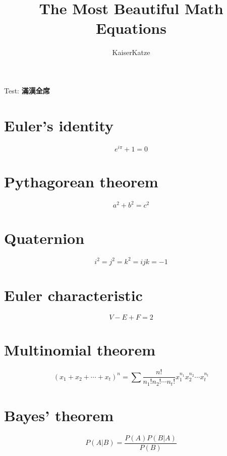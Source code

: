 \documentclass[12pt,twoside]{ctexart}
\title{The Most Beautiful Math Equations}
\author{KaiserKatze}
\begin{document}
Test:
\textbf{滿漢全席}

\maketitle

\section{Euler's identity}

$$ e^{i \pi} + 1 = 0 $$

\section{Pythagorean theorem}

$$ a^2 + b^2 = c^2 $$

\section{Quaternion}

$$ i^2 = j^2 = k^2 = ijk = -1 $$

\section{Euler characteristic}

$$ V - E + F = 2 $$

\section{Multinomial theorem}

$$ (x_1+x_2+\cdots+x_t)^n=\sum\frac{n!}{n_1!n_2!\cdots n_t!}x_1^{n_1}x_2^{n_2}\cdots x_t^{n_t} $$

\section{Bayes' theorem}

$$ P\left(A|B\right) = \frac{P\left(A\right)P\left(B|A\right)}{P\left(B\right)} $$
\end{document}
